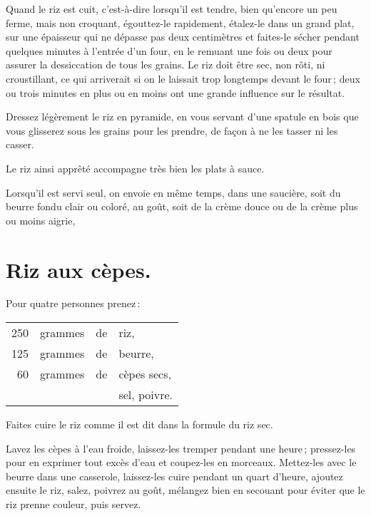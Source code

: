 Quand le riz est cuit, c'est-à-dire lorsqu'il est tendre, bien qu'encore un peu
ferme, mais non croquant, égouttez-le rapidement, étalez-le dans un grand plat,
sur une épaisseur qui ne dépasse pas deux centimètres et faites-le sécher
pendant quelques minutes à l'entrée d'un four, en le remuant une fois ou deux
pour assurer la dessiccation de tous les grains. Le riz doit être sec, non
rôti, ni croustillant, ce qui arriverait si on le laissait trop longtemps
devant le four ; deux ou trois minutes en plus ou en moins ont une grande
influence sur le résultat.

Dressez légèrement le riz en pyramide, en vous servant d'une spatule en bois
que vous glisserez sous les grains pour les prendre, de façon à ne les tasser
ni les casser.

Le riz ainsi apprêté accompagne très bien les plats à sauce.

Lorsqu'il est servi seul, on envoie en même temps, dans une saucière, soit du
beurre fondu clair ou coloré, au goût, soit de la crème douce ou de la crème
plus ou moins aigrie,

\section*{\centering Riz aux cèpes.}
{}

Pour quatre personnes prenez :

\footnotesize
\begin{longtable}{rrrp{16em}}
    250 & grammes & de & riz,                                                                             \\
    125 & grammes & de & beurre,                                                                          \\
     60 & grammes & de & cèpes secs,                                                                      \\
        &         &    & sel, poivre.                                                                     \\
\end{longtable}
\normalsize

Faites cuire le riz comme il est dit dans la formule du riz sec.
\label{pg0708-1} \hypertarget{p0708-1}{}

Lavez les cèpes à l'eau froide, laissez-les tremper pendant une heure ;
pressez-les pour en exprimer tout excès d'eau et coupez-les en morceaux.
Mettez-les avec le beurre dans une casserole, laissez-les cuire pendant un
quart d'heure, ajoutez ensuite le riz, salez, poivrez au goût, mélangez bien en
secouant pour éviter que le riz prenne couleur, puis servez.

